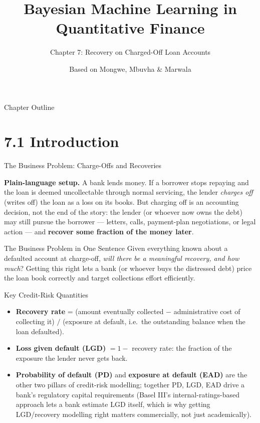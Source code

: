 \documentclass[aspectratio=169,10pt]{beamer}
\title[Bayesian ML in QF -- Ch.7]{Bayesian Machine Learning in Quantitative Finance}
\subtitle{Chapter 7: Recovery on Charged-Off Loan Accounts}
\author{Based on Mongwe, Mbuvha \& Marwala}
\date{}
\begin{document}
\begin{frame}
  \titlepage
\end{frame}

\begin{frame}{Chapter Outline}
  \tableofcontents
\end{frame}

\section{7.1 Introduction}

\begin{frame}[allowframebreaks]{The Business Problem: Charge-Offs and Recoveries}

\textbf{Plain-language setup.} A bank lends money. If a borrower stops repaying and the loan is deemed uncollectable through normal servicing, the lender \emph{charges off} (writes off) the loan as a loss on its books. But charging off is an accounting decision, not the end of the story: the lender (or whoever now owns the debt) may still pursue the borrower --- letters, calls, payment-plan negotiations, or legal action --- and \textbf{recover some fraction of the money later}.

\begin{alertblock}{The Business Problem in One Sentence}
Given everything known about a defaulted account at charge-off, \emph{will there be a meaningful recovery, and how much}? Getting this right lets a bank (or whoever buys the distressed debt) price the loan book correctly and target collections effort efficiently.
\end{alertblock}

\begin{block}{Key Credit-Risk Quantities}
\begin{itemize}
  \item \textbf{Recovery rate} = (amount eventually collected $-$ administrative cost of collecting it) $/$ (exposure at default, i.e.\ the outstanding balance when the loan defaulted).
  \item \textbf{Loss given default (LGD)} $= 1 - $ recovery rate: the fraction of the exposure the lender never gets back.
  \item \textbf{Probability of default (PD)} and \textbf{exposure at default (EAD)} are the other two pillars of credit-risk modelling; together PD, LGD, EAD drive a bank's regulatory capital requirements (Basel III's internal-ratings-based approach lets a bank estimate LGD itself, which is why getting LGD/recovery modelling right matters commercially, not just academically).
\end{itemize}
\end{block}


\end{frame}
\end{document}
